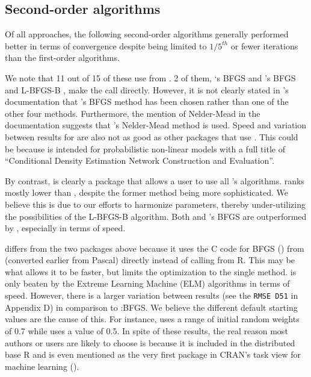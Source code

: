 \hypertarget{second-order-algorithms}{%
\subsection{Second-order algorithms}\label{second-order-algorithms}}

Of all approaches, the following second-order algorithms generally
performed better in terms of convergence despite being limited to
\(1/5^{th}\) or fewer iterations than the first-order algorithms.

We note that 11 out of 15 of these  use
 from . 2 of them, `s BFGS
\citep{R-CaDENCE} and 's BFGS and L-BFGS-B
\citep{R-validann}, make the call directly. However, it is not clearly
stated in 's documentation that 's BFGS method
has been chosen rather than one of the other four methods. Furthermore,
the mention of Nelder-Mead in the documentation suggests that
's Nelder-Mead method is used. Speed and variation between
results for  are also not as good as other packages that
use . This could be because  is intended for
probabilistic non-linear models with a full title of ``Conditional
Density Estimation Network Construction and Evaluation''.

By contrast,  is clearly a package that allows a user to
use all 's algorithms.  ranks
mostly lower than , despite the former method
being more sophisticated. We believe this is due to our efforts to
harmonize parameters, thereby under-utilizing the possibilities of the
L-BFGS-B algorithm. Both  and 's BFGS are
outperformed by , especially in terms of speed.

 \citep{R-nnet} differs from the two packages above because it
uses the C code for BFGS () from  (converted
earlier from Pascal) directly instead of calling  from R.
This may be what allows it to be faster, but limits the optimization to
the single method.  is only beaten by the Extreme Learning
Machine (ELM) algorithms in terms of speed. However, there is a larger
variation between results (see the \texttt{RMSE\ D51} in Appendix D) in
comparison to :BFGS. We believe the different default
starting values are the cause of this. For instance,  uses a
range of initial random weights of 0.7 while  uses a value
of 0.5. In spite of these results, the real reason most authors or users
are likely to choose  is because it is included in the
distributed base R and is even mentioned as the very first package in
CRAN's task view for machine learning ().

